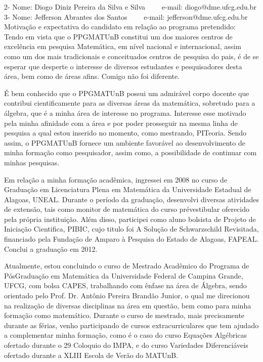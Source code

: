 \documentclass[11pt]{article}
\begin{document}
2- Nome: Diogo Diniz Pereira da Silva e Silva
\ \ \ \ e-mail: diogo@dme.ufcg.edu.br
\\
3- Nome: Jefferson Abrantes dos Santos
\ \ \ \ e-mail: jefferson@dme.ufcg.edu.br
\\[0.2cm]
Motivação e expectativa do candidato em relação ao programa pretendido:
\\Tendo em vista que o PPGMATUnB constitui um dos maiores centros de excelência em pesquisa Matemática, em nível nacional e internacional, assim como um dos mais tradicionais e conceituados centros de pesquisa do pais, é de se esperar que desperte o interesse de diversos estudantes e pesquisadores desta área, bem como de áreas afins. Comigo não foi diferente.  

É bem conhecido que o PPGMATUnB possui um admirável corpo docente que contribui cientificamente para as diversas áreas da matemática, sobretudo para a álgebra, que é a minha área de interesse no programa. Interesse esse motivado pela minha afinidade com a área e por poder prosseguir na mesma linha de pesquisa a qual estou inserido no momento, como mestrando, PITeoria. Sendo assim, o PPGMATUnB fornece um ambiente favorável ao desenvolvimento de minha formação como pesquisador, assim como, a possibilidade de continuar com minhas pesquisas. 

Em relação a minha formação acadêmica, ingressei em 2008 no curso de Graduação em Licenciatura Plena em Matemática da Universidade Estadual de Alagoas, UNEAL. Durante o período da graduação, desenvolvi diversas atividades de extensão, tais como monitor de matemática do curso prévestibular oferecido pela própria instituição. Além disso, participei como aluno bolsista de Projeto de Iniciação Cientifica, PIBIC, cujo titulo foi A Solução de Schwarzschild Revisitada, financiado pela Fundação de Amparo à Pesquisa do Estado de Alagoas, FAPEAL. Conclui a graduação em 2012.

Atualmente, estou concluindo o curso de Mestrado Acadêmico do Programa de PósGraduação em Matemática da Universidade Federal de Campina Grande, UFCG, com bolsa CAPES, trabalhando com ênfase na área de Álgebra, sendo orientado pelo Prof. Dr. Antônio Pereira Brandão Junior, o qual me direcionou na realização de diversas disciplinas na área em questão, bem como para minha formação como matemático. Durante o curso de mestrado, mais precisamente durante as férias, venho participando de cursos extracurriculares que tem ajudado a complementar minha formação, como é o caso do curso Equações Algébricas ofertado durante o 29 Coloquio do IMPA, e do curso  Variedades Diferenciáveis ofertado durante a XLIII Escola de Verão do MATUnB.
\end{document}
